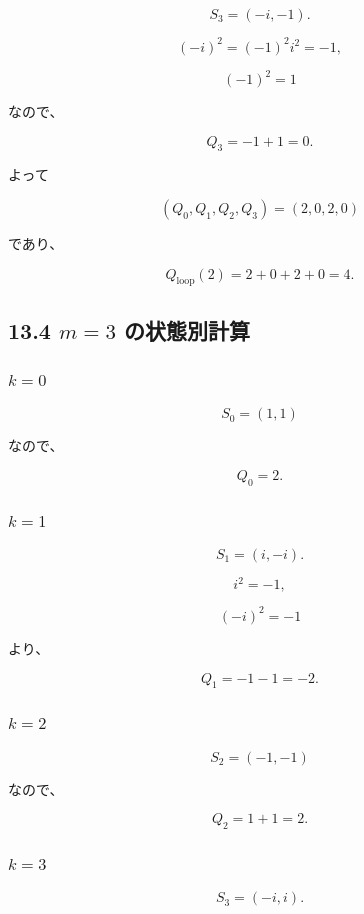 \documentclass[
  a4paper,
]{ltjsarticle}
\begin{document}
\[
S_3=(-i,-1).
\]

\[
(-i)^2
=
(-1)^2i^2
=
-1,
\]

\[
(-1)^2=1
\]

なので、

\[
Q_3
=
-1+1
=
0.
\]

よって

\[
\boxed{
(Q_0,Q_1,Q_2,Q_3)
=
(2,0,2,0)
}
\]

であり、

\[
Q_{\mathrm{loop}}(2)
=
2+0+2+0
=
\boxed{4}.
\]

\subsection{\texorpdfstring{13.4 \(m=3\)
の状態別計算}{13.4 m=3 の状態別計算}}\label{m3-ux306eux72b6ux614bux5225ux8a08ux7b97}

\subsubsection{\texorpdfstring{\(k=0\)}{k=0}}\label{k0-3}

\[
S_0=(1,1)
\]

なので、

\[
Q_0=2.
\]

\subsubsection{\texorpdfstring{\(k=1\)}{k=1}}\label{k1-3}

\[
S_1=(i,-i).
\]

\[
i^2=-1,
\]

\[
(-i)^2=-1
\]

より、

\[
Q_1
=
-1-1
=
-2.
\]

\subsubsection{\texorpdfstring{\(k=2\)}{k=2}}\label{k2-3}

\[
S_2=(-1,-1)
\]

なので、

\[
Q_2
=
1+1
=
2.
\]

\subsubsection{\texorpdfstring{\(k=3\)}{k=3}}\label{k3-3}

\[
S_3=(-i,i).
\]
\end{document}
